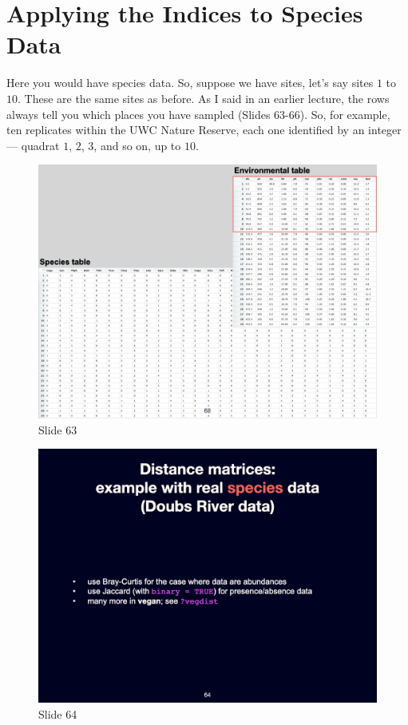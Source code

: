 \documentclass[
  11pt,
]{book}
\begin{document}
\section{Applying the Indices to Species
Data}\label{applying-the-indices-to-species-data}

Here you would have species data. So, suppose we have sites, let's say
sites \(1\) to \(10\). These are the same sites as before. As I said in
an earlier lecture, the rows always tell you which places you have
sampled (Slides 63-66). So, for example, ten replicates within the UWC
Nature Reserve, each one identified by an integer --- quadrat \(1\),
\(2\), \(3\), and so on, up to \(10\).

\begin{figure}[ht]
\centering
\includegraphics[width=0.8\linewidth]{../images/BDC334/BDC334-063.jpeg}
\caption*{Slide 63}
\end{figure}

\begin{figure}[ht]
\centering
\includegraphics[width=0.8\linewidth]{../images/BDC334/BDC334-064.jpeg}
\caption*{Slide 64}
\end{figure}
\end{document}
